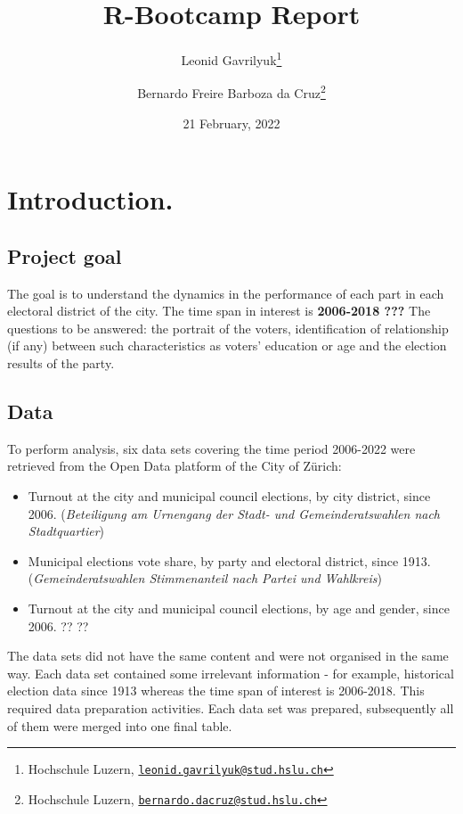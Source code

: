 \documentclass[
]{article}
\title{R-Bootcamp Report}
\author{Leonid Gavrilyuk\footnote{Hochschule Luzern,
  \href{mailto:leonid.gavrilyuk@stud.hslu.ch}{\nolinkurl{leonid.gavrilyuk@stud.hslu.ch}}} \and Bernardo
Freire Barboza da Cruz\footnote{Hochschule Luzern,
  \href{mailto:bernardo.dacruz@stud.hslu.ch}{\nolinkurl{bernardo.dacruz@stud.hslu.ch}}}}
\date{21 February, 2022}
\providecommand{\tightlist}{%
  \setlength{\itemsep}{0pt}\setlength{\parskip}{0pt}}
\begin{document}
\maketitle

\centering
\raggedright
\newpage
\tableofcontents
\pagebreak

\hypertarget{introduction.}{%
\section{Introduction.}\label{introduction.}}

\hypertarget{project-goal}{%
\subsection{Project goal}\label{project-goal}}

The goal is to understand the dynamics in the performance of each part
in each electoral district of the city. The time span in interest is
\textbf{2006-2018 ???} The questions to be answered: the portrait of the
voters, identification of relationship (if any) between such
characteristics as voters' education or age and the election results of
the party.

\hypertarget{data}{%
\subsection{Data}\label{data}}

To perform analysis, six data sets covering the time period 2006-2022
were retrieved from the Open Data platform of the City of Zürich:

\begin{itemize}
\tightlist
\item
  Turnout at the city and municipal council elections, by city district,
  since 2006. (\emph{Beteiligung am Urnengang der Stadt- und
  Gemeinderatswahlen nach Stadtquartier})
\item
  Municipal elections vote share, by party and electoral district, since
  1913. (\emph{Gemeinderatswahlen Stimmenanteil nach Partei und
  Wahlkreis})
\item
  Turnout at the city and municipal council elections, by age and
  gender, since 2006. ?? ??
\end{itemize}

The data sets did not have the same content and were not organised in
the same way. Each data set contained some irrelevant information - for
example, historical election data since 1913 whereas the time span of
interest is 2006-2018. This required data preparation activities. Each
data set was prepared, subsequently all of them were merged into one
final table.
\end{document}
